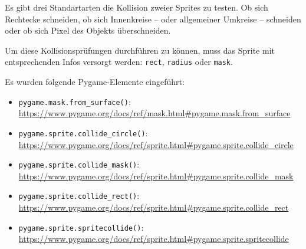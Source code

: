 Es gibt drei Standartarten die Kollision zweier Sprites zu testen. Ob sich Rechtecke schneiden, ob sich Innenkreise -- oder allgemeiner Umkreise -- schneiden oder ob sich Pixel des Objekts überschneiden. 

Um diese Kollisionsprüfungen durchführen zu können, muss das Sprite mit entsprechenden Infos versorgt werden: \texttt{rect}, \texttt{radius} oder \texttt{mask}.

Es wurden folgende Pygame-Elemente eingeführt:
\begin{itemize}
	\item \texttt{pygame.mask.from\_surface()}:
	\\ 
    \url{https://www.pygame.org/docs/ref/mask.html#pygame.mask.from_surface}
	
	\item \texttt{pygame.sprite.collide\_circle()}:
	\\ 
    \url{https://www.pygame.org/docs/ref/sprite.html#pygame.sprite.collide_circle}

	\item \texttt{pygame.sprite.collide\_mask()}:
	\\ 
    \url{https://www.pygame.org/docs/ref/sprite.html#pygame.sprite.collide_mask}

	\item \texttt{pygame.sprite.collide\_rect()}:
	\\ 
    \url{https://www.pygame.org/docs/ref/sprite.html#pygame.sprite.collide_rect}
	
	\item \texttt{pygame.sprite.spritecollide()}:
	\\ 
    \url{https://www.pygame.org/docs/ref/sprite.html#pygame.sprite.spritecollide}
	
\end{itemize}

